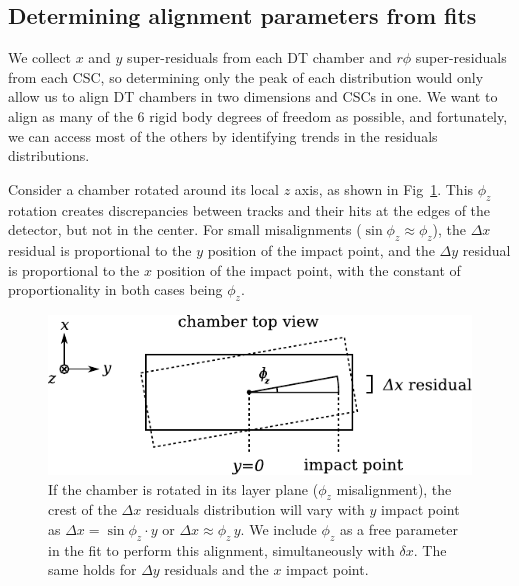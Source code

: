 \documentclass[12pt]{article}
\begin{document}
\subsection{Determining alignment parameters from fits}
\label{sec:alignment_from_fits}

We collect $x$ and $y$ super-residuals from each DT chamber and
$r\phi$ super-residuals from each CSC, so determining only the peak of
each distribution would only allow us to align DT chambers in two
dimensions and CSCs in one.  We want to align as many of the 6 rigid
body degrees of freedom as possible, and fortunately, we can access
most of the others by identifying trends in the residuals
distributions.

Consider a chamber rotated around its local $z$ axis, as shown in
Fig~\ref{fig:phiz}.  This $\phi_z$ rotation creates discrepancies
between tracks and their hits at the edges of the detector, but not in
the center.  For small misalignments ($\sin\phi_z \approx \phi_z$),
the $\Delta x$ residual is proportional to the $y$ position of the
impact point, and the $\Delta y$ residual is proportional to the $x$
position of the impact point, with the constant of proportionality in
both cases being $\phi_z$.

\begin{figure}
\begin{center} \includegraphics{phiz_diagram.pdf} \end{center}
\caption{If the chamber is rotated in its layer plane ($\phi_z$ misalignment), the crest of the $\Delta x$ residuals distribution will vary with $y$ impact point as $\Delta x = \sin \phi_z \cdot y$ or $\Delta x \approx \phi_z \, y$.  We include $\phi_z$ as a free parameter in the fit to perform this alignment, simultaneously with $\delta x$.  The same holds for $\Delta y$ residuals and the $x$ impact point.  \label{fig:phiz}}
\end{figure}
\end{document}
